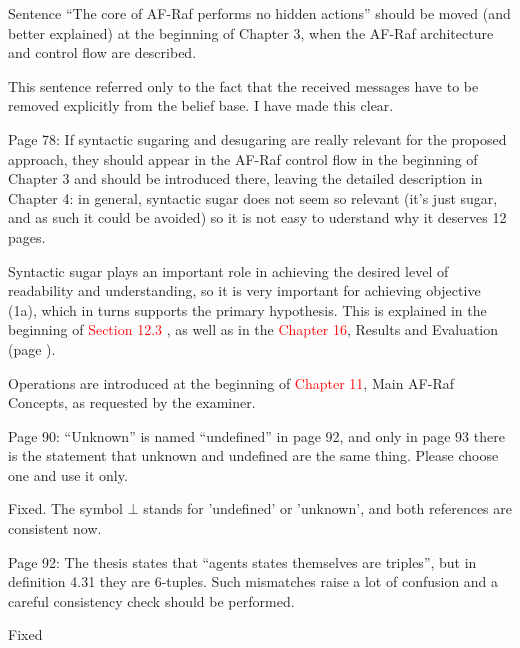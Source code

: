\documentclass{article}
\newcommand*\R[1]{\textcolor{red}{#1}} %
\newenvironment{them}{\noindent\begingroup\color{blue}}{\endgroup\par}
\begin{document}
\begin{them}

Sentence ``The core of AF-Raf performs no hidden actions'' should be moved (and
better explained) at the beginning of Chapter 3, when the AF-Raf architecture
and control flow are described.

\end{them}
This sentence referred only to the fact that the received messages have to be
removed explicitly from the belief base. I have made this clear.

\begin{them}

Page 78:
If syntactic sugaring and desugaring are really relevant for the proposed
approach, they should appear in the AF-Raf control flow in the beginning of
Chapter 3 and should be introduced there, leaving the detailed description in
Chapter 4: in general, syntactic sugar does not seem so relevant (it's just
sugar, and as such it could be avoided) so it is not easy to uderstand why it
deserves 12 pages.

\end{them}

Syntactic sugar plays an important role in achieving the desired level of
readability and understanding, so it is very important for achieving objective
(1a), which in turns supports the primary hypothesis. This is explained in the
beginning of \R{Section 12.3} , as well as in the \R{Chapter 16}, Results and
Evaluation (page ).

Operations are introduced at the beginning of \R{Chapter 11}, Main AF-Raf
Concepts, as requested by the examiner.

\begin{them}

Page 90:
``Unknown'' is named ``undefined'' in page 92, and only in page 93 there is the
statement that unknown and undefined are the same thing. Please choose one and
use it only.

\end{them}
Fixed. The symbol $\bot$ stands for 'undefined' or 'unknown', and both
references are consistent now. 

\begin{them}

Page 92:
The thesis states that ``agents states themselves are triples'', but in
definition 4.31 they are 6-tuples.  Such mismatches raise a lot of confusion
and a careful consistency check should be performed.

\end{them}
Fixed
\end{document}
